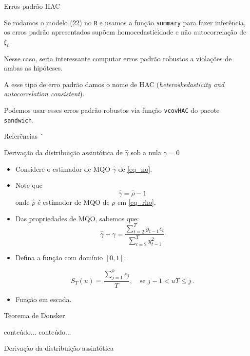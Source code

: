 \documentclass[11pt]{beamer}
\newenvironment{halfwideitemize}{\itemize\addtolength{\itemsep}{0.5em}}{\enditemize}
\begin{document}
\begin{frame}{Erros padrão HAC}
	\begin{halfwideitemize}
		\item Se rodamos o modelo (22) no \texttt{R} e usamos a função \texttt{summary} para fazer inferência, os erros padrão apresentados supõem homocedasticidade e não autocorrelação de $\xi_t$.
		\item Nesse caso, seria interessante computar erros padrão robustos a violações de ambas as hipóteses.
		\begin{halfwideitemize}
			\item A esse tipo de erro padrão damos o nome de HAC (\textit{heteroskedasticity and autocorrelation consistent}).
		\end{halfwideitemize}
		\item Podemos usar esses erros padrão robustos via função \texttt{vcovHAC} do pacote \texttt{sandwich}.
	\end{halfwideitemize}
\end{frame}

\begin{frame}[allowframebreaks]{Referências}
	\printbibliography´
\end{frame}

\appendix
\begin{frame}{Derivação da distribuição assintótica de $\hat{\gamma}$ sob a nula $\gamma = 0$ }
	\label{app_donsker}
	
	\begin{itemize}
		\item Considere o estimador de MQO $\hat{\gamma}$ de \eqref{eq_no}.
		\item Note que
		$$\hat{\gamma} = \hat{\rho} - 1$$
		onde $\hat{\rho}$ é estimador de MQO de $\rho$ em \eqref{eq_rho}.
		\item Das propriedades de MQO, sabemos que:
		$$\hat{\gamma} -  \gamma = \frac{\sum_{t=2}^T y_{t-1}\epsilon_t}{\sum_{t=2}^T y_{t-1}^2}$$
		\item Defina a função com domínio $[0,1]$:
		
		$$S_T(u) = 
			\frac{\sum_{j=1}^{k}\epsilon_j}{T}, \quad \text{se } j-1 < u T \leq  j\, .
		$$
		\item Função em escada.
	\end{itemize}
\end{frame}

\begin{frame}{Teorema de Donsker}
	\begin{block}{conteúdo...}
		conteúdo...
	\end{block}
\end{frame}

\begin{frame}{Derivação da distribuição assintótica}
	 \hyperlink{main_text}{} 
\end{frame}
\end{document}
